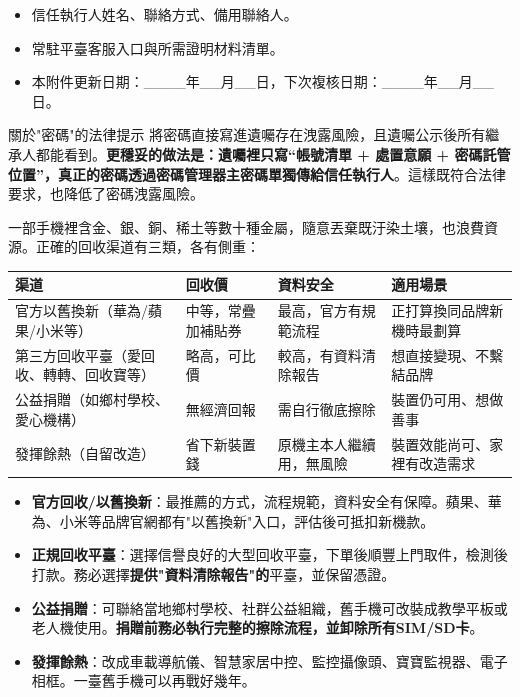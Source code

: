 \begin{itemize}
  \item 信任執行人姓名、聯絡方式、備用聯絡人。
  \item 常駐平臺客服入口與所需證明材料清單。
  \item 本附件更新日期：\_\_\_\_年\_\_月\_\_日，下次複核日期：\_\_\_\_年\_\_月\_\_日。
\end{itemize}

\begin{tcbwarn}{關於"密碼"的法律提示}
將密碼直接寫進遺囑存在洩露風險，且遺囑公示後所有繼承人都能看到。\textbf{更穩妥的做法是：遺囑裡只寫“帳號清單 + 處置意願 + 密碼託管位置”，真正的密碼透過密碼管理器主密碼單獨傳給信任執行人}。這樣既符合法律要求，也降低了密碼洩露風險。

\end{tcbwarn}


一部手機裡含金、銀、銅、稀土等數十種金屬，隨意丟棄既汙染土壤，也浪費資源。正確的回收渠道有三類，各有側重：

\begin{center}
\begin{tabularx}{\linewidth}{|X|X|X|X|}
\hline
\textbf{渠道} & \textbf{回收價} & \textbf{資料安全} & \textbf{適用場景} \tabularnewline
\hline
官方以舊換新（華為/蘋果/小米等） & 中等，常疊加補貼券 & 最高，官方有規範流程 & 正打算換同品牌新機時最劃算 \tabularnewline
第三方回收平臺（愛回收、轉轉、回收寶等） & 略高，可比價 & 較高，有資料清除報告 & 想直接變現、不繫結品牌 \tabularnewline
公益捐贈（如鄉村學校、愛心機構） & 無經濟回報 & 需自行徹底擦除 & 裝置仍可用、想做善事 \tabularnewline
發揮餘熱（自留改造） & 省下新裝置錢 & 原機主本人繼續用，無風險 & 裝置效能尚可、家裡有改造需求 \tabularnewline
\hline
\end{tabularx}
\end{center}

\begin{itemize}
  \item \textbf{官方回收/以舊換新}：最推薦的方式，流程規範，資料安全有保障。蘋果、華為、小米等品牌官網都有"以舊換新"入口，評估後可抵扣新機款。
  \item \textbf{正規回收平臺}：選擇信譽良好的大型回收平臺，下單後順豐上門取件，檢測後打款。務必選擇\textbf{提供"資料清除報告"的}平臺，並保留憑證。
  \item \textbf{公益捐贈}：可聯絡當地鄉村學校、社群公益組織，舊手機可改裝成教學平板或老人機使用。\textbf{捐贈前務必執行完整的擦除流程，並卸除所有SIM/SD卡}。
  \item \textbf{發揮餘熱}：改成車載導航儀、智慧家居中控、監控攝像頭、寶寶監視器、電子相框。一臺舊手機可以再戰好幾年。
\end{itemize}

